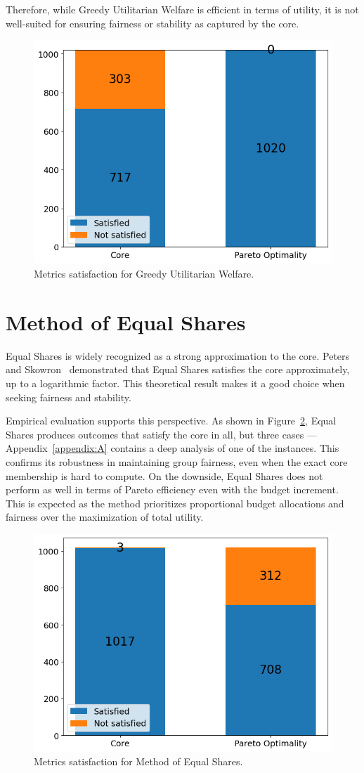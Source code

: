 \documentclass[magisterska,en]{pracamgr}
\begin{document}
Therefore, while Greedy Utilitarian Welfare is efficient in terms of utility, it is not well-suited for ensuring fairness or stability as captured by the core.

\begin{figure}[h!]
    \centering
    \includegraphics[width=0.46\linewidth]{outputs/MetricSatisfaction/greedy.png}
    \caption{Metrics satisfaction for Greedy Utilitarian Welfare.}
    \label{greedy-metrics}
\end{figure}

\section{Method of Equal Shares}

Equal Shares is widely recognized as a strong approximation to the core. Peters and Skowron~\cite{9} demonstrated that Equal Shares satisfies the core approximately, up to a logarithmic factor. This theoretical result makes it a good choice when seeking fairness and stability.

Empirical evaluation supports this perspective. As shown in Figure~\ref{mes-metrics}, Equal Shares produces outcomes that satisfy the core in all, but three cases --- Appendix~\ref{appendix:A} contains a deep analysis of one of the instances. This confirms its robustness in maintaining group fairness, even when the exact core membership is hard to compute. On the downside, Equal Shares does not perform as well in terms of Pareto efficiency even with the budget increment. This is expected as the method prioritizes proportional budget allocations and fairness over the maximization of total utility.

\begin{figure}[h!]
    \centering
    \includegraphics[width=0.46\linewidth]{outputs/MetricSatisfaction/mes.png}
    \caption{Metrics satisfaction for Method of Equal Shares.}
    \label{mes-metrics}
\end{figure}
\end{document}

